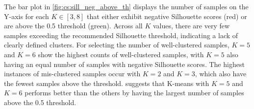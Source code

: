 The bar plot in \cref{fig:cs:sill_neg_above_th} displays the number of samples on the Y-axis for each $K \in [3, 8]$ that either exhibit negative Silhouette scores (red) or are above the 0.5 threshold (green). Across all $K$ values, there are very few samples exceeding the recommended Silhouette threshold, indicating a lack of clearly defined clusters. For selecting the number of well-clustered samples, $K=5$ and $K=6$ show the highest counts of well-clustered samples, with $K=5$ also having an equal number of samples with negative Silhouette scores. The highest instances of mis-clustered samples occur with $K=2$ and $K=3$, which also have the fewest samples above the threshold.  suggests that K-means with $K=5$ and $K=6$ performs better than the others by having the largest number of samples above the 0.5 threshold.


